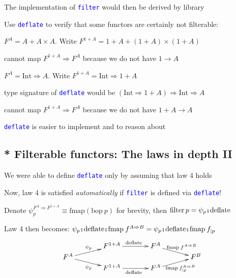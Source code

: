 The implementation of \texttt{\textcolor{blue}{\footnotesize{}filter}}
would then be derived by library

Use \texttt{\textcolor{blue}{\footnotesize{}deflate}} to verify that
some functors are certainly not filterable:

$F^{A}=A+A\times A$. Write $F^{1+A}=1+A+(1+A)\times(1+A)$ 

cannot map $F^{1+A}\Rightarrow F^{A}$ because we do not have $1\rightarrow A$

$F^{A}=\text{Int}\Rightarrow A$. Write $F^{1+A}=\text{Int}\Rightarrow1+A$ 

type signature of \texttt{\textcolor{blue}{\footnotesize{}deflate}}
would be $\left(\text{Int}\Rightarrow1+A\right)\Rightarrow\text{Int}\Rightarrow A$

cannot map $F^{1+A}\Rightarrow F^{A}$ because we do not have $1+A\rightarrow A$

\texttt{\textcolor{blue}{\footnotesize{}deflate}} is easier to implement
and to reason about


\subsection{{*} Filterable functors: The laws in depth II}

We were able to define \texttt{\textcolor{blue}{\footnotesize{}deflate}}
only by assuming that law 4 holds

Now, law 4 is satisfied \emph{automatically} if \texttt{\textcolor{blue}{\footnotesize{}filter}}
is defined via \texttt{\textcolor{blue}{\footnotesize{}deflate}}!

Denote {\footnotesize{}$\psi_{p}^{F^{A}\Rightarrow F^{1+A}}\equiv\text{fmap}\left(\text{bop}\:p\right)$
for brevity, then $\text{filter}\,p=\psi_{p}\bef\text{deflate}$}{\footnotesize\par}

Law 4 then becomes: {\footnotesize{}$\psi_{p}\bef\text{deflate}\bef\text{fmap}\:f^{A\Rightarrow B}=\psi_{p}\bef\text{deflate}\bef\text{fmap}\:f_{|p}$
\[
\xymatrix{\xyScaleY{0.1pc}\xyScaleX{3pc} & F^{1+A}\ar[r]\sp(0.5){\text{deflate}} & F^{A}\ar[rd]\sp(0.5){\text{ fmap}\:f^{A\Rightarrow B}}\\
F^{A}\ar[ru]\sp(0.5){\psi_{p}}\ar[rd]\sb(0.5){\psi_{p}} &  &  & F^{B}\\
 & F^{1+A}\ar[r]\sb(0.5){\text{deflate}} & F^{A}\ar[ru]\sb(0.5){\text{fmap}\:f_{|p}^{A\Rightarrow B}}
}
\]
}{\footnotesize\par}

